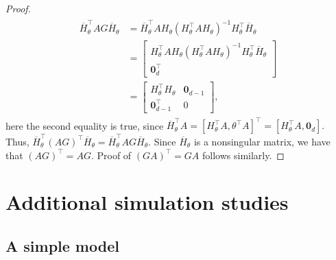 \begin{proof}
\begin{align}\label{eq:AG}
\begin{split}
\overline{H}^\top_\theta AG \overline{H}_\theta &=\overline{H}^\top_\theta A H_\theta (H_\theta^\top {A} H_\theta)^{-1} H_\theta^\top \overline{H}_\theta\\
&= \begin{bmatrix}
    H^\top_\theta  A H_\theta(H_\theta^\top {A} H_\theta)^{-1} H_\theta^\top \overline{H}_\theta\\
   \mathbf{0}_d^\top
   \end{bmatrix}\\
 &= \begin{bmatrix}
    H^\top_\theta H_\theta &
   \mathbf{0}_{d-1} \\
   \mathbf{0}_{d-1}^\top& 
   0
   \end{bmatrix},
\end{split}
\end{align}
here the second equality is true, since $ \overline{H}^\top_\theta A =[H_\theta^\top A ,\theta^\top A]^\top = [H_\theta^\top A, \mathbf{0}_d].$
Thus, $\overline{H}^\top_\theta (AG)^\top \overline{H}_\theta =\overline{H}^\top_\theta AG \overline{H}_\theta$. Since $ \overline{H}_\theta $ is a nonsingular matrix, we have that $(AG)^\top =AG.$ Proof of $(GA)^\top= GA$ follows similarly.
\end{proof}

\section{Additional simulation studies}\label{app:add_simul}
\subsection{A simple model}

